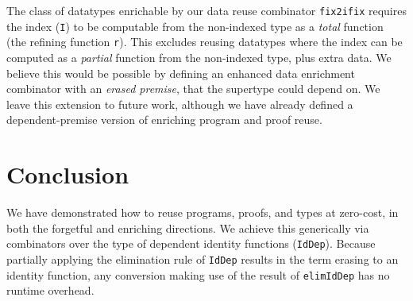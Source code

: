 \documentclass[acmsmall]{acmart}\settopmatter{}
\newcommand{\labsec}[1]{\label{sec:#1}}
\begin{document}
The class of datatypes enrichable by our data reuse combinator \verb;fix2ifix;
requires the index (\verb;I;) to be computable from the non-indexed
type as a \textit{total} function (the refining function
\verb;r;). This excludes reusing datatypes where the index can be
computed as a \textit{partial} function from the non-indexed type,
plus extra data. We believe this would be possible by defining an
enhanced data enrichment combinator with an \textit{erased premise}, that
the supertype could depend on. We leave this extension to future work,
although we have already defined a dependent-premise version of
enriching program and proof reuse.

\section{Conclusion}

We have demonstrated how to reuse programs, proofs, and types at
zero-cost, in both the forgetful and enriching directions. We achieve
this generically via combinators over the type of dependent identity
functions (\verb;IdDep;). Because partially applying the elimination
rule of \verb;IdDep; results in the term erasing to an identity
function, any conversion making use of the result of \verb;elimIdDep;
has no runtime overhead.

\labsec{conc}





\end{document}
